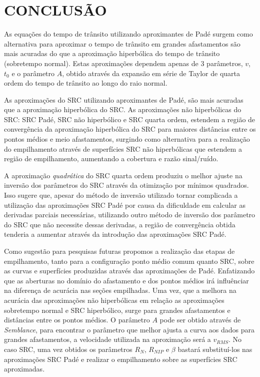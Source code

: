 \chapter{CONCLUSÃO}
\label{cap8}

As equações do tempo de trânsito utilizando aproximantes de Padé 
surgem como alternativa para aproximar o tempo de trânsito em grandes afastamentos
são mais acuradas do que a aproximação hiperbólica do tempo de
trânsito (sobretempo normal). Estas aproximações dependem apenas de 3 parâmetros,  $v$,  $t_0$ e o parâmetro $A$,
obtido
através da expansão em série de Taylor de quarta ordem do tempo de trânsito ao longo do raio normal.

As aproximações do SRC utilizando aproximantes de Padé, são mais acuradas que a aproximação hiperbólica do SRC. 
As aproximações
não hiperbólicas do SRC: SRC Padé, SRC não hiperbólico e SRC quarta ordem, estendem a região de convergência da aproximação
hiperbólica do SRC para maiores distâncias entre os pontos médios e meio afastamentos, surgindo como alternativa 
para a realização do empilhamento através de superfícies SRC não hiperbólicas que estendem a região de empilhamento,
aumentando a cobertura e razão sinal/ruído.

A aproximação \textit{quadrática} do SRC quarta ordem produziu o melhor ajuste na inversão dos parâmetros do SRC
através da otimização por mínimos quadrados. 
Isso sugere que, apesar do método de inversão utilizado
tornar complicada a utilização das aproximações SRC Padé por causa da dificuldade
em calcular as derivadas parciais
necessárias, utilizando outro método de inversão dos parâmetro do SRC que não necessite dessas
derivadas,
a região de convergência obtida tenderia a aumentar através da introdução das aproximações SRC Padé.


Como sugestão para pesquisas futuras propomos a realização das etapas de empilhamento, tanto para a configuração 
ponto médio comum quanto SRC, sobre as curvas e superfícies produzidas através das aproximações de Padé. 
Enfatizando que as aberturas no domínio do afastamento e dos pontos médios irá influênciar na diferença
de acurácia nas seções empilhadas. Uma vez, que a melhora na acurácia das aproximações não hiperbólicas em
relação as aproximações sobretempo normal e SRC hiperbólico, surge
para grandes afastamentos e distâncias entre os pontos médios.
O parâmetro $A$ pode
ser obtido através de \textit{Semblance}, para encontrar o parâmetro
que melhor ajusta a curva aos dados para grandes afastamentos, a velocidade
utilizada na aproximação será a $v_{RMS}$. No caso SRC, uma vez obtidos os parâmetros $R_N$,
$R_{NIP}$ e $\beta$ bastará substituí-los nas aproximações SRC Padé e realizar 
o empilhamento sobre as superfícies SRC aproximadas.
